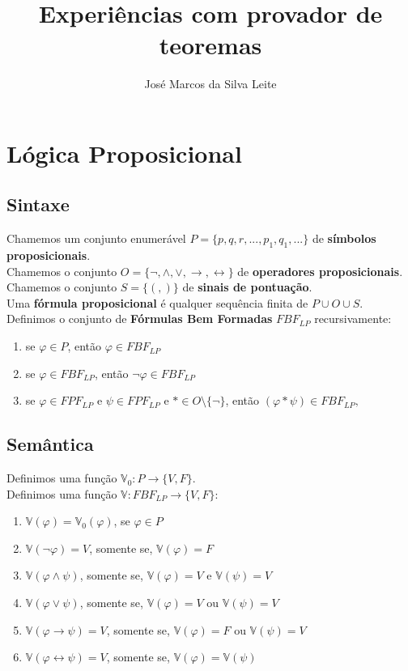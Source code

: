 \documentclass[a4paper,final,12pt]{article}
\title{Experiências com provador de teoremas}
\author{José Marcos da Silva Leite}
\begin{document}
	\maketitle
	
	\section{Lógica Proposicional}
	\subsection{Sintaxe}
	\indent Chamemos um conjunto enumerável $P = \{p, q, r, ..., p_{1}, q_{1}, ...\}$ de \textbf{símbolos proposicionais}. \\
	\indent Chamemos o conjunto $O = \{\lnot, \land, \lor, \to, \leftrightarrow \}$ de \textbf{operadores proposicionais}. \\
	\indent Chamemos o conjunto $S = \{(, )\}$ de \textbf{sinais de pontuação}. \\
	\indent Uma \textbf{fórmula proposicional} é qualquer sequência finita de $P \cup O \cup S$. \\
	\indent Definimos o conjunto de \textbf{Fórmulas Bem Formadas} $FBF_{LP}$ recursivamente:
	\begin{enumerate}
		\item se $\varphi \in P$, então $\varphi \in FBF_{LP}$
		\item se $\varphi \in FBF_{LP}$, então $\lnot\varphi \in FBF_{LP}$
		\item se $\varphi \in FPF_{LP}$ e $\psi \in FPF_{LP}$ e $* \in O \setminus \{\lnot\}$, então $(\varphi * \psi) \in FBF_{LP},$
	\end{enumerate}

	\subsection{Semântica}
	Definimos uma função $\mathbb{V}_{0} : P \to \{V, F\}$. \\
	\indent Definimos uma função $\mathbb{V} : FBF_{LP} \to \{V, F\}$:
	\begin{enumerate}
		\item $\mathbb{V}(\varphi) = \mathbb{V}_{0}(\varphi)$, se $\varphi \in P$
		\item $\mathbb{V}(\lnot\varphi) = V$, somente se, $\mathbb{V}(\varphi) = F$
		\item $\mathbb{V}(\varphi \land \psi)$, somente se, $\mathbb{V}(\varphi) = V$ e $\mathbb{V}(\psi) = V$
		\item $\mathbb{V}(\varphi \lor \psi)$, somente se, $\mathbb{V}(\varphi) = V$ ou $\mathbb{V}(\psi) = V$
		\item $\mathbb{V}(\varphi \to \psi) = V$, somente se, $\mathbb{V}(\varphi) = F$ ou $\mathbb{V}(\psi) = V$
		\item $\mathbb{V}(\varphi \leftrightarrow \psi) = V$, somente se, $\mathbb{V}(\varphi) = \mathbb{V}(\psi)$
	\end{enumerate}
	
\end{document}
